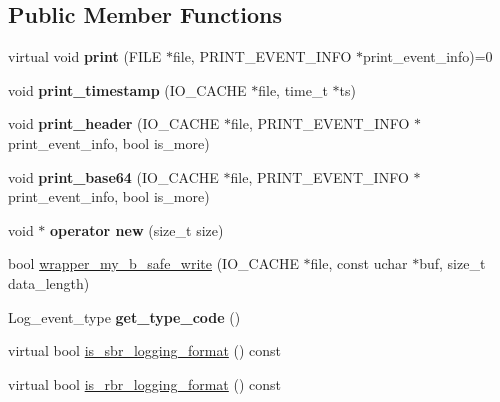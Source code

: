 \subsection*{Public Member Functions}
\begin{DoxyCompactItemize}
\item 
\mbox{\label{classLog__event_ada67a22e354623768cdf9155d1d1e733}} 
virtual void {\bfseries print} (F\+I\+LE $\ast$file, P\+R\+I\+N\+T\+\_\+\+E\+V\+E\+N\+T\+\_\+\+I\+N\+FO $\ast$print\+\_\+event\+\_\+info)=0
\item 
\mbox{\label{classLog__event_a8860f6c36437b27c568ed157a36f12a2}} 
void {\bfseries print\+\_\+timestamp} (I\+O\+\_\+\+C\+A\+C\+HE $\ast$file, time\+\_\+t $\ast$ts)
\item 
\mbox{\label{classLog__event_a4addf757e318ff8ba23d888e4304e02c}} 
void {\bfseries print\+\_\+header} (I\+O\+\_\+\+C\+A\+C\+HE $\ast$file, P\+R\+I\+N\+T\+\_\+\+E\+V\+E\+N\+T\+\_\+\+I\+N\+FO $\ast$print\+\_\+event\+\_\+info, bool is\+\_\+more)
\item 
\mbox{\label{classLog__event_a9d8200f60538e0b35f7a52b4db1218de}} 
void {\bfseries print\+\_\+base64} (I\+O\+\_\+\+C\+A\+C\+HE $\ast$file, P\+R\+I\+N\+T\+\_\+\+E\+V\+E\+N\+T\+\_\+\+I\+N\+FO $\ast$print\+\_\+event\+\_\+info, bool is\+\_\+more)
\item 
\mbox{\label{classLog__event_a42485730e8bd508e54753a2344838a0e}} 
void $\ast$ {\bfseries operator new} (size\+\_\+t size)
\item 
bool \mbox{\hyperlink{classLog__event_a65dc0fdcdcc26bdf0289e0fec9cd9337}{wrapper\+\_\+my\+\_\+b\+\_\+safe\+\_\+write}} (I\+O\+\_\+\+C\+A\+C\+HE $\ast$file, const uchar $\ast$buf, size\+\_\+t data\+\_\+length)
\item 
\mbox{\label{classLog__event_ab7d4331849d34614d0ec066d1300ff26}} 
Log\+\_\+event\+\_\+type {\bfseries get\+\_\+type\+\_\+code} ()
\item 
virtual bool \mbox{\hyperlink{classLog__event_ad4d689d007b7c8f1b0d54e65d8f34069}{is\+\_\+sbr\+\_\+logging\+\_\+format}} () const
\item 
virtual bool \mbox{\hyperlink{classLog__event_abd996ad9f33a59c3b03737beb2c2869d}{is\+\_\+rbr\+\_\+logging\+\_\+format}} () const

\end{DoxyCompactItemize}
